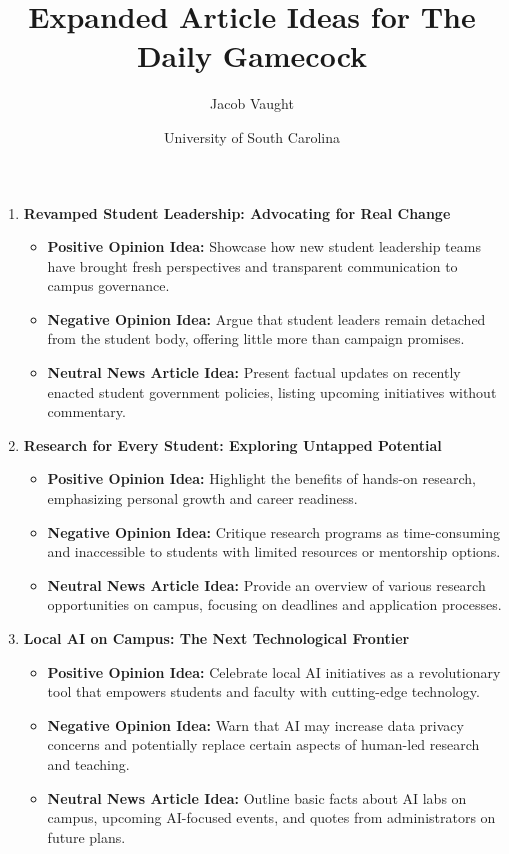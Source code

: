 \documentclass{article}
\title{Expanded Article Ideas for The Daily Gamecock}
\author{Jacob Vaught}
\date{University of South Carolina}
\begin{document}
\maketitle

\begin{enumerate}
    \item \textbf{Revamped Student Leadership: Advocating for Real Change}
    \begin{itemize}
        \item \textbf{Positive Opinion Idea:} Showcase how new student leadership teams have brought fresh perspectives and transparent communication to campus governance.
        \item \textbf{Negative Opinion Idea:} Argue that student leaders remain detached from the student body, offering little more than campaign promises.
        \item \textbf{Neutral News Article Idea:} Present factual updates on recently enacted student government policies, listing upcoming initiatives without commentary.
    \end{itemize}

    \item \textbf{Research for Every Student: Exploring Untapped Potential}
    \begin{itemize}
        \item \textbf{Positive Opinion Idea:} Highlight the benefits of hands-on research, emphasizing personal growth and career readiness.
        \item \textbf{Negative Opinion Idea:} Critique research programs as time-consuming and inaccessible to students with limited resources or mentorship options.
        \item \textbf{Neutral News Article Idea:} Provide an overview of various research opportunities on campus, focusing on deadlines and application processes.
    \end{itemize}

    \item \textbf{Local AI on Campus: The Next Technological Frontier}
    \begin{itemize}
        \item \textbf{Positive Opinion Idea:} Celebrate local AI initiatives as a revolutionary tool that empowers students and faculty with cutting-edge technology.
        \item \textbf{Negative Opinion Idea:} Warn that AI may increase data privacy concerns and potentially replace certain aspects of human-led research and teaching.
        \item \textbf{Neutral News Article Idea:} Outline basic facts about AI labs on campus, upcoming AI-focused events, and quotes from administrators on future plans.
    \end{itemize}
\end{enumerate}
\end{document}
